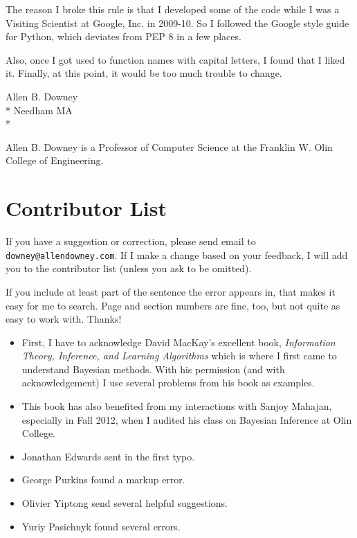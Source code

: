 \documentclass[12pt]{book}
\begin{document}
The reason I broke this rule is that I developed some of the
code while I was a Visiting Scientist at Google, Inc. in 2009-10.
So I followed the Google style guide for Python, which deviates
from PEP 8 in a few places.

Also, once I got used to function names with capital letters, I
found that I liked it.  Finally, at this point, it would be too
much trouble to change.


Allen B. Downey \\*
Needham MA \\*

Allen B. Downey is a Professor of Computer Science at 
the Franklin W. Olin College of Engineering.







\section*{Contributor List}

If you have a suggestion or correction, please send email to 
{\tt downey@allendowney.com}.  If I make a change based on your
feedback, I will add you to the contributor list
(unless you ask to be omitted).

If you include at least part of the sentence the
error appears in, that makes it easy for me to search.  Page and
section numbers are fine, too, but not quite as easy to work with.
Thanks!

\small

\begin{itemize}

\item First, I have to acknowledge David MacKay's excellent book,
  {\it Information Theory, Inference, and Learning Algorithms} which is
  where I first came to understand Bayesian methods.  With his
  permission (and with acknowledgement) I use several problems from
  his book as examples.

\item This book has also benefited from my interactions with Sanjoy
  Mahajan, especially in Fall 2012, when I audited his class on
  Bayesian Inference at Olin College.

\item Jonathan Edwards sent in the first typo.

\item George Purkins found a markup error.

\item Olivier Yiptong send several helpful suggestions.

\item Yuriy Pasichnyk found several errors.


\end{itemize}
\end{document}
